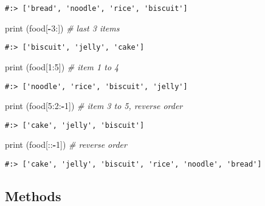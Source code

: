 \documentclass[
]{book}
\newenvironment{Shaded}{\begin{snugshade}}{\end{snugshade}}
\newcommand{\BuiltInTok}[1]{#1}
\newcommand{\CommentTok}[1]{\textcolor[rgb]{0.37,0.37,0.37}{\textit{#1}}}
\newcommand{\DecValTok}[1]{\textcolor[rgb]{0.06,0.06,0.06}{#1}}
\newcommand{\NormalTok}[1]{#1}
\newcommand{\OperatorTok}[1]{\textcolor[rgb]{0.43,0.43,0.43}{\textbf{#1}}}
\begin{document}
\begin{verbatim}
#:> ['bread', 'noodle', 'rice', 'biscuit']
\end{verbatim}

\begin{Shaded}
\begin{Highlighting}[]
\BuiltInTok{print}\NormalTok{ (food[}\OperatorTok{{-}}\DecValTok{3}\NormalTok{:])    }\CommentTok{\# last 3 items}
\end{Highlighting}
\end{Shaded}

\begin{verbatim}
#:> ['biscuit', 'jelly', 'cake']
\end{verbatim}

\begin{Shaded}
\begin{Highlighting}[]
\BuiltInTok{print}\NormalTok{ (food[}\DecValTok{1}\NormalTok{:}\DecValTok{5}\NormalTok{])    }\CommentTok{\# item 1 to 4}
\end{Highlighting}
\end{Shaded}

\begin{verbatim}
#:> ['noodle', 'rice', 'biscuit', 'jelly']
\end{verbatim}

\begin{Shaded}
\begin{Highlighting}[]
\BuiltInTok{print}\NormalTok{ (food[}\DecValTok{5}\NormalTok{:}\DecValTok{2}\NormalTok{:}\OperatorTok{{-}}\DecValTok{1}\NormalTok{]) }\CommentTok{\# item 3 to 5, reverse order}
\end{Highlighting}
\end{Shaded}

\begin{verbatim}
#:> ['cake', 'jelly', 'biscuit']
\end{verbatim}

\begin{Shaded}
\begin{Highlighting}[]
\BuiltInTok{print}\NormalTok{ (food[::}\OperatorTok{{-}}\DecValTok{1}\NormalTok{])   }\CommentTok{\# reverse order}
\end{Highlighting}
\end{Shaded}

\begin{verbatim}
#:> ['cake', 'jelly', 'biscuit', 'rice', 'noodle', 'bread']
\end{verbatim}

\hypertarget{methods}{%
\subsection{Methods}\label{methods}}
\end{document}
